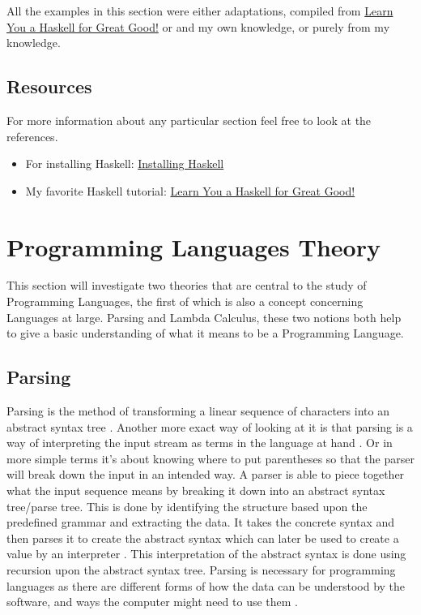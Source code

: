 \documentclass{article}
\begin{document}
All the examples in this section were either adaptations, compiled from \href {http://learnyouahaskell.com/chapters}{Learn You a Haskell for Great Good!} or \cite{PL} and my own knowledge, or purely from my knowledge.

\subsection{Resources}

For more information about any particular section feel free to look at the references.

\begin{itemize}
    \item For installing Haskell: \href{https://hackmd.io/@alexhkurz/Hk86XnCzD}{Installing Haskell}
    
    \item My favorite Haskell tutorial: \href {http://learnyouahaskell.com/chapters}{Learn You a Haskell for Great Good!}
    
\end{itemize}

\section{Programming Languages Theory}
This section will investigate two theories that are central to the study of Programming Languages, the first of which is also a concept concerning Languages at large. Parsing and Lambda Calculus, these two notions both help to give a basic understanding of what it means to be a Programming Language.

\subsection{Parsing}

Parsing is the method of transforming a linear sequence of characters into an abstract syntax tree \cite{P}. Another more exact way of looking at it is that parsing is a way of interpreting the input stream as terms in the language at hand \cite{AS}. Or in more simple terms it's about knowing where to put parentheses so that the parser will break down the input in an intended way. A parser is able to piece together what the input sequence means by breaking it down into an abstract syntax tree/parse tree. This is done by identifying the structure based upon the predefined grammar and extracting the data. It takes the concrete syntax and then parses it to create the abstract syntax which can later be used to create a value by an interpreter \cite{PL}. This interpretation of the abstract syntax is done using recursion upon the abstract syntax tree. Parsing is necessary for programming languages as there are different forms of how the data can be understood by the software, and ways the computer might need to use them \cite{GP}.
\end{document}
